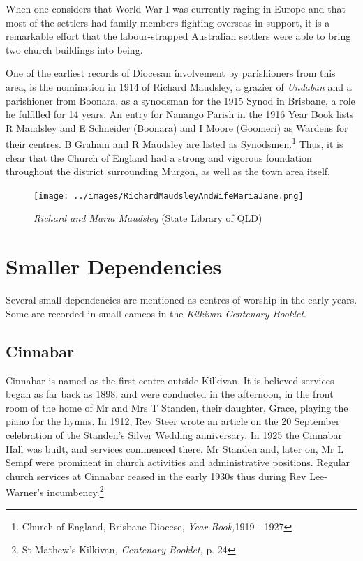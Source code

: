 When one considers that World War I was currently raging in Europe and that most of the settlers had family members fighting overseas in support, it is a remarkable effort that the labour-strapped Australian settlers were able to bring two church buildings into being.



One of the earliest records of Diocesan involvement by parishioners from this area, is the nomination in 1914 of Richard Maudsley, a grazier of \emph{Undaban} and a parishioner from Boonara, as a synodsman for the 1915 Synod in Brisbane, a role he fulfilled for 14 years. An entry for Nanango Parish in the 1916 Year Book lists R Maudsley and E Schneider (Boonara) and I Moore (Goomeri) as Wardens for their centres. B Graham and R Maudsley are listed as Synodsmen.\footnote{Church of England, Brisbane Diocese, \emph{Year Book,}1919 - 1927} Thus, it is clear that the Church of England had a strong and vigorous foundation throughout the district surrounding Murgon, as well as the town area itself.








\begin{figure}
\begin{center}
\texttt{[image: ../images/RichardMaudsleyAndWifeMariaJane.png]}
\caption{{\itshape Richard and Maria Maudsley} {\scriptsize(State Library of QLD)}}
\end{center}
\end{figure}




\section{Smaller Dependencies}



Several small dependencies are mentioned as centres of worship in the early years. Some are recorded in small cameos in the \emph{Kilkivan Centenary Booklet}.



\subsection{Cinnabar}



Cinnabar is named as the first centre outside Kilkivan. It is believed services began as far back as 1898, and were conducted in the afternoon, in the front room of the home of Mr and Mrs T Standen, their daughter, Grace, playing the piano for the hymns. In 1912, Rev Steer wrote an article on the 20 September celebration of the Standen's Silver Wedding anniversary. In 1925 the Cinnabar Hall was built, and services commenced there. Mr Standen and, later on, Mr L Sempf were prominent in church activities and administrative positions. Regular church services at Cinnabar ceased in the early 1930s thus during Rev Lee-Warner's incumbency.\footnote{St Mathew's Kilkivan\emph{, Centenary Booklet,} p. 24}


